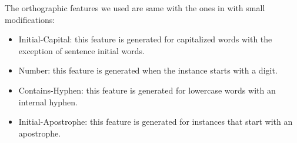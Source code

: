 

The orthographic features we used are same with the ones in
\cite{yatbaz-sert-yuret:2012:EMNLP-CoNLL} with small modifications:
\begin{itemize}
\item Initial-Capital: this feature is generated for capitalized words
  with the exception of sentence initial words.
\item Number: this feature is generated when the instance starts with a
  digit.
\item Contains-Hyphen: this feature is generated for lowercase words
  with an internal hyphen.
\item Initial-Apostrophe: this feature is generated for instances that
  start with an apostrophe.
\end{itemize}

